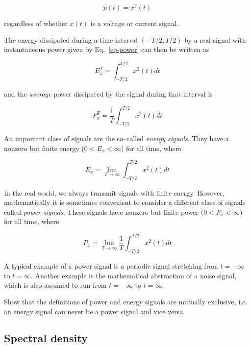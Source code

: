 \begin{equation}
p(t) =  x^2(t) \label{eq-power}
\end{equation}  

regardless of whether $x(t)$ is a voltage or current signal.

The energy dissipated during a time interval $(-T/2, T/2)$ by a real signal with instantaneous power given by Eq.~\ref{eq-power} can then be written as

\begin{equation}
E_x^T = \int_{-T/2}^{T/2} x^2(t) dt
\end{equation} 

and the \emph{average} power dissipated by the signal during that interval is

\begin{equation}
P_x^T = \frac{1}{T}\int_{-T/2}^{T/2} x^2(t) dt
\end{equation} 

An important class of signals are the so--called \emph{energy signals}. They have a nonzero but finite energy ($0 < E_x < \infty$) for all time, where

\begin{equation}
E_x  = \lim_{T \to \infty}  \int_{-T/2}^{T/2} x^2(t) dt 
\end{equation} 

In the real world, we always transmit signals with finite energy. However, mathematically it is sometimes convenient to consider a different class of signals called \emph{power signals}. These signals have nonzero but finite power ($0 < P_x < \infty$) for all time, where

\begin{equation}
P_x = \lim_{T \to \infty} \frac{1}{T} \int_{-T/2}^{T/2} x^2(t) dt 
\end{equation} 

A typical example of a power signal is a periodic signal stretching from $t=-\infty$ to $t=\infty$. Another example is the mathematical abstraction of a noise signal, which is also assumed to run from $t=-\infty$ to $t=\infty$.

\begin{sidebar}
\begin{ex}
Show that the definitions of power and energy signals are mutually exclusive, i.e. an energy signal can never be a power signal and vice versa.
\end{ex}
\end{sidebar}

\subsection{Spectral density}

